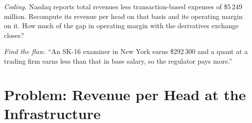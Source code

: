 \begin{exercise}[$\star\star\star$]\label{exo:in:exchanges-brokers-vendors-and-regulators-as-employers:7}
\emph{Coding.} Nasdaq reports total revenues less transaction-based expenses of \$5\,249 million. Recompute its revenue per
head on that basis and its operating margin on it. How much of the gap in operating margin with the derivatives exchange closes?
\end{exercise}

\begin{exercise}[$\star\star\star$]\label{exo:in:exchanges-brokers-vendors-and-regulators-as-employers:8}
\emph{Find the flaw.} ``An SK-16 examiner in New York earns \$292\,300 and a quant at a trading firm earns less than that
in base salary, so the regulator pays more.''
\end{exercise}

\section{Problem: Revenue per Head at the Infrastructure}

